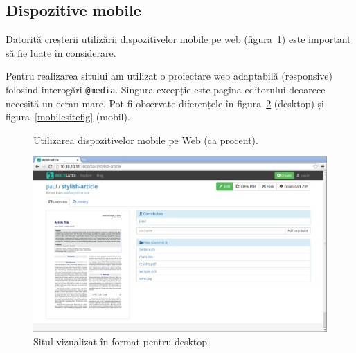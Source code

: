 \documentclass[a4wide,12pt]{report}
\newcommand{\eng}[1]{{#1}} %
\newcommand{\cod}[1]{\texttt{#1}}
\begin{document}
\subsection{Dispozitive mobile}

Datorită creșterii utilizării dispozitivelor mobile pe web
(figura~\ref{mobilefig}) este important să fie luate în considerare.

Pentru realizarea sitului am utilizat o proiectare web adaptabilă
(\eng{responsive}) folosind interogări \cod{@media}. Singura excepție este
pagina editorului deoarece necesită un ecran mare. Pot fi observate diferențele
în figura~\ref{desktopsitefig} (desktop) și figura~\ref{mobilesitefig} (mobil).

\begin{figure}[hb]
\begin{center}
\end{center}
\caption{Utilizarea dispozitivelor mobile pe Web (ca procent)\cite{statcount}.}
\label{mobilefig}
\end{figure}

\begin{figure}
\begin{center}
\includegraphics[width=16cm]{imagini/desktop}
\end{center}
\caption{Situl vizualizat în format pentru desktop.}
\label{desktopsitefig}
\end{figure}
\end{document}
